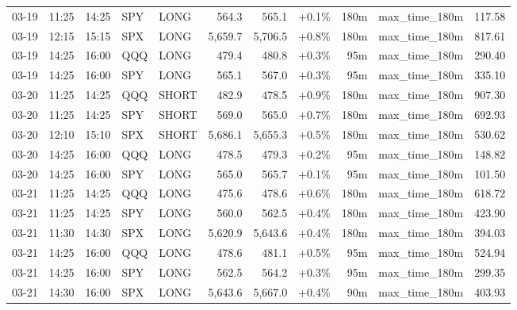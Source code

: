 \documentclass[11pt,a4paper,twoside]{article}
\begin{document}
\begin{center}
\begin{longtable}{>{\color{txtmain}}l l l l l r r r r >{\color{txtmain}}l r}
03-19 & 11:25 & 14:25 & SPY & LONG & 564.3 & 565.1 & \textcolor{wingreen}{+0.1\%} & 180m & max\_time\_180m & \textcolor{wingreen}{117.58} \\
03-19 & 12:15 & 15:15 & SPX & LONG & 5,659.7 & 5,706.5 & \textcolor{wingreen}{+0.8\%} & 180m & max\_time\_180m & \textcolor{wingreen}{817.61} \\
03-19 & 14:25 & 16:00 & QQQ & LONG & 479.4 & 480.8 & \textcolor{wingreen}{+0.3\%} & 95m & max\_time\_180m & \textcolor{wingreen}{290.40} \\
03-19 & 14:25 & 16:00 & SPY & LONG & 565.1 & 567.0 & \textcolor{wingreen}{+0.3\%} & 95m & max\_time\_180m & \textcolor{wingreen}{335.10} \\
03-20 & 11:25 & 14:25 & QQQ & SHORT & 482.9 & 478.5 & \textcolor{wingreen}{+0.9\%} & 180m & max\_time\_180m & \textcolor{wingreen}{907.30} \\
03-20 & 11:25 & 14:25 & SPY & SHORT & 569.0 & 565.0 & \textcolor{wingreen}{+0.7\%} & 180m & max\_time\_180m & \textcolor{wingreen}{692.93} \\
03-20 & 12:10 & 15:10 & SPX & SHORT & 5,686.1 & 5,655.3 & \textcolor{wingreen}{+0.5\%} & 180m & max\_time\_180m & \textcolor{wingreen}{530.62} \\
03-20 & 14:25 & 16:00 & QQQ & LONG & 478.5 & 479.3 & \textcolor{wingreen}{+0.2\%} & 95m & max\_time\_180m & \textcolor{wingreen}{148.82} \\
03-20 & 14:25 & 16:00 & SPY & LONG & 565.0 & 565.7 & \textcolor{wingreen}{+0.1\%} & 95m & max\_time\_180m & \textcolor{wingreen}{101.50} \\
03-21 & 11:25 & 14:25 & QQQ & LONG & 475.6 & 478.6 & \textcolor{wingreen}{+0.6\%} & 180m & max\_time\_180m & \textcolor{wingreen}{618.72} \\
03-21 & 11:25 & 14:25 & SPY & LONG & 560.0 & 562.5 & \textcolor{wingreen}{+0.4\%} & 180m & max\_time\_180m & \textcolor{wingreen}{423.90} \\
03-21 & 11:30 & 14:30 & SPX & LONG & 5,620.9 & 5,643.6 & \textcolor{wingreen}{+0.4\%} & 180m & max\_time\_180m & \textcolor{wingreen}{394.03} \\
03-21 & 14:25 & 16:00 & QQQ & LONG & 478.6 & 481.1 & \textcolor{wingreen}{+0.5\%} & 95m & max\_time\_180m & \textcolor{wingreen}{524.94} \\
03-21 & 14:25 & 16:00 & SPY & LONG & 562.5 & 564.2 & \textcolor{wingreen}{+0.3\%} & 95m & max\_time\_180m & \textcolor{wingreen}{299.35} \\
03-21 & 14:30 & 16:00 & SPX & LONG & 5,643.6 & 5,667.0 & \textcolor{wingreen}{+0.4\%} & 90m & max\_time\_180m & \textcolor{wingreen}{403.93} \\

\end{longtable}
\end{center}
\end{document}
